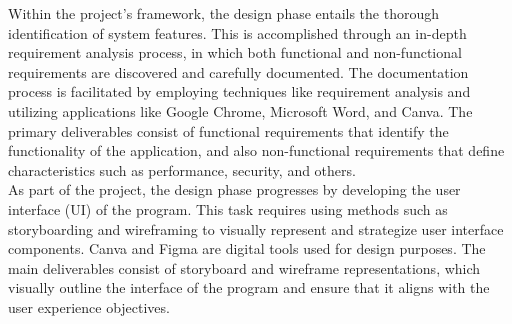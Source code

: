 Within the project's framework, the design phase entails the thorough identification of system features. This is accomplished through an in-depth requirement analysis process, in which both functional and non-functional requirements are discovered and carefully documented. The documentation process is facilitated by employing techniques like requirement analysis and utilizing applications like Google Chrome, Microsoft Word, and Canva. The primary deliverables consist of functional requirements that identify the functionality of the application, and also non-functional requirements that define characteristics such as performance, security, and others. \\

As part of the project, the design phase progresses by developing the user interface (UI) of the program. This task requires using methods such as storyboarding and wireframing to visually represent and strategize user interface components. Canva and Figma are digital tools used for design purposes. The main deliverables consist of storyboard and wireframe representations, which visually outline the interface of the program and ensure that it aligns with the user experience objectives. \\

